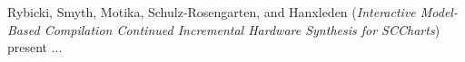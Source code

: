 


Rybicki, Smyth, Motika,
Schulz-Rosengarten, and Hanxleden
\cite{isola-2016-rybicki}
({\em Interactive Model-Based Compilation Continued
Incremental Hardware Synthesis for SCCharts})
present ...
